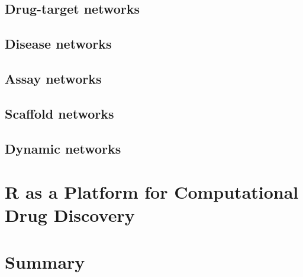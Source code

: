 \documentclass[12pt,letterpaper]{article}
\begin{document}
\subsection{Drug-target networks}
\label{sec:drug-target-networks}


\subsection{Disease networks}
\label{sec:disease-networks}

\subsection{Assay networks}
\label{sec:assay-networks}

\subsection{Scaffold networks}
\label{sec:scaffold-networks}


\subsection{Dynamic networks}
\label{sec:dynamic-networks}


\section{R as a Platform for Computational Drug Discovery}
\label{sec:r-as-platform}

\section{Summary}
\label{sec:summary}


\end{document}
